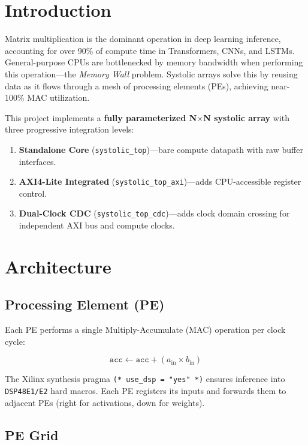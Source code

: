\documentclass[12pt, a4paper]{article}
\begin{document}
\tableofcontents
\newpage

\section{Introduction}

Matrix multiplication is the dominant operation in deep learning inference, accounting for over 90\% of compute time in Transformers, CNNs, and LSTMs. General-purpose CPUs are bottlenecked by memory bandwidth when performing this operation---the \textit{Memory Wall} problem. Systolic arrays solve this by reusing data as it flows through a mesh of processing elements (PEs), achieving near-100\% MAC utilization.

This project implements a \textbf{fully parameterized N$\times$N systolic array} with three progressive integration levels:

\begin{enumerate}[leftmargin=2cm]
    \item \textbf{Standalone Core} (\texttt{systolic\_top})---bare compute datapath with raw buffer interfaces.
    \item \textbf{AXI4-Lite Integrated} (\texttt{systolic\_top\_axi})---adds CPU-accessible register control.
    \item \textbf{Dual-Clock CDC} (\texttt{systolic\_top\_cdc})---adds clock domain crossing for independent AXI bus and compute clocks.
\end{enumerate}

\section{Architecture}

\subsection{Processing Element (PE)}

Each PE performs a single Multiply-Accumulate (MAC) operation per clock cycle:

\[
\texttt{acc} \gets \texttt{acc} + (a_{\text{in}} \times b_{\text{in}})
\]

The Xilinx synthesis pragma \texttt{(* use\_dsp = "yes" *)} ensures inference into \texttt{DSP48E1/E2} hard macros. Each PE registers its inputs and forwards them to adjacent PEs (right for activations, down for weights).

\subsection{PE Grid}
\end{document}
